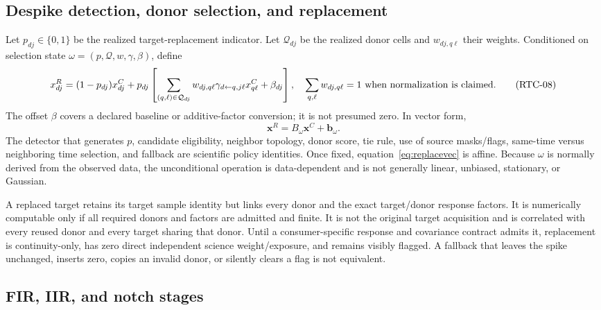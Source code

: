 \documentclass[11pt]{article}
\begin{document}
\subsection{Despike detection, donor selection, and replacement}

Let $p_{dj}\in\{0,1\}$ be the realized target-replacement indicator.  Let
$\mathcal Q_{dj}$ be the realized donor cells and $w_{dj,q\ell}$ their weights.
Conditioned on selection state
$\omega=(p,\mathcal Q,w,\gamma,\beta)$, define
\begin{equation}
 x^R_{dj}=(1-p_{dj})x^C_{dj}
  +p_{dj}\left[
    \sum_{(q,\ell)\in\mathcal Q_{dj}}
      w_{dj,q\ell}\gamma_{d\leftarrow q,j\ell}x^C_{q\ell}
    +\beta_{dj}\right],
 \quad \sum_{q,\ell}w_{dj,q\ell}=1
 \ \hbox{when normalization is claimed}.
 \tag{RTC-08}\label{eq:replace}
\end{equation}
The offset $\beta$ covers a declared baseline or additive-factor conversion;
it is not presumed zero.  In vector form,
\begin{equation}
 \mathbf x^R=B_{\omega}\mathbf x^C+\mathbf b_{\omega}.
 \tag{RTC-09}\label{eq:replacevec}
\end{equation}
The detector that generates $p$, candidate eligibility, neighbor topology,
donor score, tie rule, use of source masks/flags, same-time versus neighboring
time selection, and fallback are scientific policy identities.  Once fixed,
equation~\eqref{eq:replacevec} is affine.  Because $\omega$ is normally derived
from the observed data, the unconditional operation is data-dependent and is
not generally linear, unbiased, stationary, or Gaussian.

A replaced target retains its target sample identity but links every donor and
the exact target/donor response factors.  It is numerically computable only if
all required donors and factors are admitted and finite.  It is not the
original target acquisition and is correlated with every reused donor and
every target sharing that donor.  Until a consumer-specific response and
covariance contract admits it, replacement is continuity-only, has zero direct
independent science weight/exposure, and remains visibly flagged.  A fallback
that leaves the spike unchanged, inserts zero, copies an invalid donor, or
silently clears a flag is not equivalent.

\subsection{FIR, IIR, and notch stages}
\end{document}
